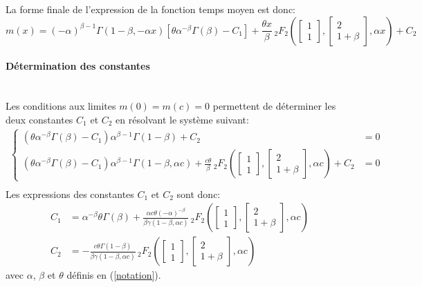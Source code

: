 La forme finale de l'expression de la fonction temps moyen est donc:
\begin{equation}\label{sol_mean}
    m(x)={(-\alpha)}^{\beta-1}\Gamma(1-\beta,-\alpha x)\left[\theta\alpha^{-\beta}\Gamma(\beta)-C_1\right]+\frac{\theta x}{\beta}\,{}_2F_2\left(\begin{bmatrix}1\\1\end{bmatrix},\begin{bmatrix}2\\1+\beta\end{bmatrix},\alpha x\right) + C_2
\end{equation}

\paragraph{Détermination des constantes}\phantom{}\\
Les conditions aux limites $m(0)=m(c)=0$ permettent de déterminer les deux constantes $C_1$ et $C_2$ en résolvant le système suivant: 
\begin{align*}
\left\{\begin{aligned}
(\theta\alpha^{-\beta}\Gamma(\beta)-C_1)\alpha^{\beta-1}\Gamma(1-\beta) + C_2 &= 0\\
(\theta\alpha^{-\beta}\Gamma(\beta)-C_1)\alpha^{\beta-1}\Gamma(1-\beta,\alpha c) + \frac{c\theta}{\beta}\,{}_2F_2\left(\begin{bmatrix}1\\1\end{bmatrix},\begin{bmatrix}2\\1+\beta\end{bmatrix},\alpha c\right)+ C_2 &= 0
\end{aligned}\right. \\
\end{align*}
Les expressions des constantes $C_1$ et $C_2$ sont donc:
\begin{equation}\label{mean_constants}
    \begin{aligned}
        C_1 &= \alpha^{-\beta}\theta\Gamma(\beta)+\frac{\alpha c \theta {(-\alpha)}^{-\beta}}{\beta\gamma(1-\beta,\alpha c)}\,{}_2F_2\left(\begin{bmatrix}1\\1\end{bmatrix},\begin{bmatrix}2\\1+\beta\end{bmatrix},\alpha c\right) \\
        C_2 &= -\frac{c\theta\Gamma(1-\beta)}{\beta\gamma(1-\beta,\alpha c)}\,{}_2F_2\left(\begin{bmatrix}1\\1\end{bmatrix},\begin{bmatrix}2\\1+\beta\end{bmatrix},\alpha c\right)
    \end{aligned}
\end{equation}
avec $\alpha$, $\beta$ et $\theta$ définis en (\ref{notation}).

